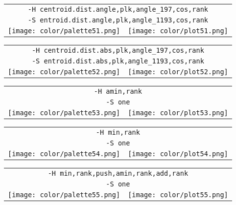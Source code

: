 \documentclass{article}
\begin{document}
\begin{center}
\begin{tabular}{m{8cm}m{8cm}}
\multicolumn{2}{c}{\tt -H centroid.dist.angle,plk,angle\_197,cos,rank} \\
\multicolumn{2}{c}{\tt -S entroid.dist.angle,plk,angle\_1193,cos,rank} \\
\texttt{[image: color/palette51.png]} &
\texttt{[image: color/plot51.png]}
\end{tabular}
\end{center}

\begin{center}
\begin{tabular}{m{8cm}m{8cm}}
\multicolumn{2}{c}{\tt -H centroid.dist.abs,plk,angle\_197,cos,rank} \\
\multicolumn{2}{c}{\tt -S entroid.dist.abs,plk,angle\_1193,cos,rank} \\
\texttt{[image: color/palette52.png]} &
\texttt{[image: color/plot52.png]}
\end{tabular}
\end{center}

\begin{center}
\begin{tabular}{m{8cm}m{8cm}}
\multicolumn{2}{c}{\tt -H amin,rank} \\
\multicolumn{2}{c}{\tt -S one} \\
\texttt{[image: color/palette53.png]} &
\texttt{[image: color/plot53.png]}
\end{tabular}
\end{center}

\begin{center}
\begin{tabular}{m{8cm}m{8cm}}
\multicolumn{2}{c}{\tt -H min,rank} \\
\multicolumn{2}{c}{\tt -S one} \\
\texttt{[image: color/palette54.png]} &
\texttt{[image: color/plot54.png]}
\end{tabular}
\end{center}

\begin{center}
\begin{tabular}{m{8cm}m{8cm}}
\multicolumn{2}{c}{\tt -H min,rank,push,amin,rank,add,rank} \\
\multicolumn{2}{c}{\tt -S one} \\
\texttt{[image: color/palette55.png]} &
\texttt{[image: color/plot55.png]}
\end{tabular}
\end{center}
\end{document}
